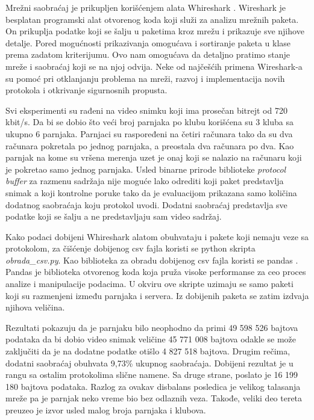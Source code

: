 \documentclass[12pt,oneside]{memoir}
\begin{document}
Mrežni saobraćaj je prikupljen korišćenjem alata Whireshark \cite{Whireshark}. Wireshark je besplatan programski alat otvorenog koda koji služi za analizu mrežnih paketa. On prikuplja podatke koji se šalju u paketima kroz mrežu i prikazuje sve njihove detalje. Pored mogućnosti prikazivanja omogućava i sortiranje paketa u klase prema zadatom kriterijumu. Ovo nam omogućava da detaljno pratimo stanje mreže i saobraćaj koji se na njoj odvija. Neke od najčešćih primena Wireshark-a su pomoć pri otklanjanju problema na mreži, razvoj i implementacija novih protokola i otkrivanje sigurnosnih propusta.

Svi eksperimenti su rađeni na video snimku koji ima prosečan bitrejt od 720 kbit/s. Da bi se dobio što veći broj parnjaka po klubu korišćena su 3 kluba sa ukupno 6 parnjaka. Parnjaci su raspoređeni na četiri računara tako da su dva računara pokretala po jednog parnjaka, a preostala dva računara po dva. Kao parnjak na kome su vršena merenja uzet je onaj koji se nalazio na računaru koji je pokretao samo jednog parnjaka. Usled binarne prirode biblioteke \textit{protocol buffer} za razmenu sadržaja nije moguće lako odrediti koji paket predstavlja snimak a koji kontrolne poruke tako da je evaluacijom prikazana samo količina dodatnog saobraćaja koju protokol uvodi. Dodatni saobraćaj predstavlja sve podatke koji se šalju a ne predstavljaju sam video sadržaj. 

Kako podaci dobijeni Whireshark alatom obuhvataju i pakete koji nemaju veze sa protokolom, za čišćenje dobijenog csv fajla koristi se python skripta \textit{obrada\_csv.py}. Kao biblioteka za obradu dobijenog csv fajla koristi se pandas \cite{Pandas}. Pandas je biblioteka otvorenog koda koja pruža visoke performanse za ceo proces analize i manipulacije podacima. U okviru ove skripte uzimaju se samo paketi koji su razmenjeni između parnjaka i servera. Iz dobijenih paketa se zatim izdvaja njihova veličina.  

Rezultati pokazuju da je parnjaku bilo neophodno da primi 49 598 526 bajtova podataka da bi dobio video snimak veličine 45 771 008 bajtova odakle se može zaključiti da je na dodatne podatke otišlo 4 827 518 bajtova. Drugim rečima, dodatni saobraćaj obuhvata 9,73\% ukupnog saobraćaja. Dobijeni rezultat je u rangu sa ostalim protokolima slične namene. Sa druge strane, poslato je 16 199 180 bajtova podataka. Razlog za ovakav disbalans posledica je velikog talasanja mreže pa je parnjak neko vreme bio bez odlaznih veza. Takođe, veliki deo tereta preuzeo je izvor usled malog broja parnjaka i klubova. 
\end{document}

